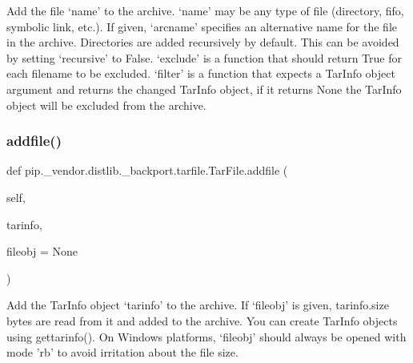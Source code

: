 \begin{DoxyVerb}Add the file `name' to the archive. `name' may be any type of file
   (directory, fifo, symbolic link, etc.). If given, `arcname'
   specifies an alternative name for the file in the archive.
   Directories are added recursively by default. This can be avoided by
   setting `recursive' to False. `exclude' is a function that should
   return True for each filename to be excluded. `filter' is a function
   that expects a TarInfo object argument and returns the changed
   TarInfo object, if it returns None the TarInfo object will be
   excluded from the archive.
\end{DoxyVerb}
 \mbox{\label{classpip_1_1__vendor_1_1distlib_1_1__backport_1_1tarfile_1_1TarFile_a9f460122e2a988ec31b0e1a7a2d18244}} 
\subsubsection{\texorpdfstring{addfile()}{addfile()}}
{\footnotesize\ttfamily def pip.\+\_\+vendor.\+distlib.\+\_\+backport.\+tarfile.\+Tar\+File.\+addfile (\begin{DoxyParamCaption}\item[{}]{self,  }\item[{}]{tarinfo,  }\item[{}]{fileobj = {\ttfamily None} }\end{DoxyParamCaption})}

\begin{DoxyVerb}Add the TarInfo object `tarinfo' to the archive. If `fileobj' is
   given, tarinfo.size bytes are read from it and added to the archive.
   You can create TarInfo objects using gettarinfo().
   On Windows platforms, `fileobj' should always be opened with mode
   'rb' to avoid irritation about the file size.
\end{DoxyVerb}
 \mbox{\label{classpip_1_1__vendor_1_1distlib_1_1__backport_1_1tarfile_1_1TarFile_a6b0f5b55cdd64b94cc73871630cd24ab}} 
